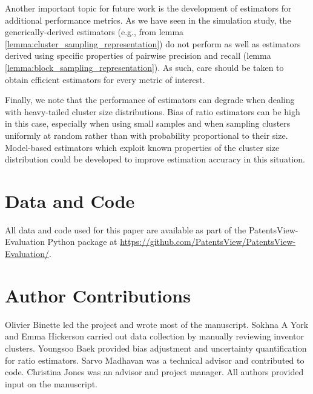 \documentclass[fontsize=11pt]{article}
\newcommand{\ob}[1]{{\color{purple}#1}}
\theoremstyle{definition}
\begin{document}
{Another important topic for future work is the development of estimators for additional performance metrics. As we have seen in the simulation study, the generically-derived estimators (e.g., from lemma \ref{lemma:cluster_sampling_representation}) do not perform as well as estimators derived using specific properties of pairwise precision and recall (lemma \ref{lemma:block_sampling_representation}). As such, care should be taken to obtain efficient estimators for every metric of interest.}

\ob{Finally, we note that the performance of estimators can degrade when dealing with heavy-tailed cluster size distributions. Bias of ratio estimators can be high in this case, especially when using small samples and when sampling clusters uniformly at random rather than with probability proportional to their size. Model-based estimators which exploit known properties of the cluster size distribution could be developed to improve estimation accuracy in this situation.}


\section*{Data and Code}

All data and code used for this paper are available as part of the PatentsView-Evaluation Python package at \hyperref[https://github.com/PatentsView/PatentsView-Evaluation/]{https://github.com/PatentsView/PatentsView-Evaluation/}.


\section*{Author Contributions}

Olivier Binette led the project and wrote most of the manuscript. Sokhna A York and Emma Hickerson carried out data collection by manually reviewing inventor clusters. Youngsoo Baek provided bias adjustment and uncertainty quantification for ratio estimators. Sarvo Madhavan was a technical advisor and contributed to code. Christina Jones was an advisor and project manager. All authors provided input on the manuscript.





\appendix
\end{document}
